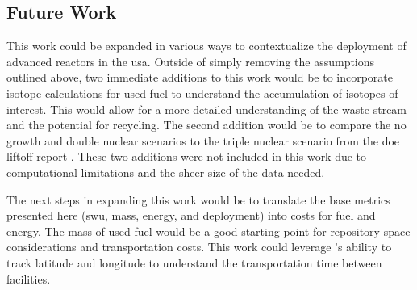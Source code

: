



\subsection{Future Work}
\label{sec:future_work}

This work could be expanded in various ways to contextualize the deployment of advanced reactors in the \gls{usa}. Outside of simply removing the assumptions outlined above, two immediate additions to this work would be to incorporate isotope calculations for used fuel to understand the accumulation of isotopes of interest. This would allow for a more detailed understanding of the waste stream and the potential for recycling. The second addition would be to compare the no growth and double nuclear scenarios to the triple nuclear scenario from the \gls{doe} liftoff report \cite{julie_liftoff_pathways_2024}. These two additions were not included in this work due to computational limitations and the sheer size of the data needed.

The next steps in expanding this work would be to translate the base metrics presented here (\gls{swu}, mass, energy, and deployment) into costs for fuel and energy. The mass of used fuel would be a good starting point for repository space considerations and transportation costs. This work could leverage \cyclus's ability to track latitude and longitude to understand the transportation time between facilities.

